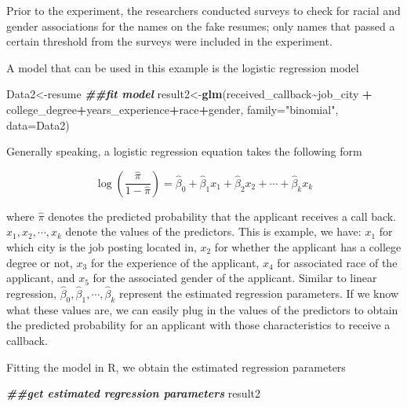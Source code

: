 \documentclass[
]{book}
\newenvironment{Shaded}{\begin{snugshade}}{\end{snugshade}}
\newcommand{\AttributeTok}[1]{\textcolor[rgb]{0.13,0.29,0.53}{#1}}
\newcommand{\DocumentationTok}[1]{\textcolor[rgb]{0.56,0.35,0.01}{\textbf{\textit{#1}}}}
\newcommand{\FunctionTok}[1]{\textcolor[rgb]{0.13,0.29,0.53}{\textbf{#1}}}
\newcommand{\NormalTok}[1]{#1}
\newcommand{\OtherTok}[1]{\textcolor[rgb]{0.56,0.35,0.01}{#1}}
\newcommand{\SpecialCharTok}[1]{\textcolor[rgb]{0.81,0.36,0.00}{\textbf{#1}}}
\newcommand{\StringTok}[1]{\textcolor[rgb]{0.31,0.60,0.02}{#1}}
\begin{document}
Prior to the experiment, the researchers conducted surveys to check for racial and gender associations for the names on the fake resumes; only names that passed a certain threshold from the surveys were included in the experiment.

A model that can be used in this example is the logistic regression model

\begin{Shaded}
\begin{Highlighting}[]
\NormalTok{Data2}\OtherTok{\textless{}{-}}\NormalTok{resume}
\DocumentationTok{\#\#fit model}
\NormalTok{result2}\OtherTok{\textless{}{-}}\FunctionTok{glm}\NormalTok{(received\_callback}\SpecialCharTok{\textasciitilde{}}\NormalTok{job\_city }\SpecialCharTok{+}\NormalTok{ college\_degree}\SpecialCharTok{+}\NormalTok{years\_experience}\SpecialCharTok{+}\NormalTok{race}\SpecialCharTok{+}\NormalTok{gender, }\AttributeTok{family=}\StringTok{"binomial"}\NormalTok{, }\AttributeTok{data=}\NormalTok{Data2)}
\end{Highlighting}
\end{Shaded}

Generally speaking, a logistic regression equation takes the following form

\[
\log (\frac{\hat{\pi}}{1-\hat{\pi}}) = \hat{\beta}_0 + \hat{\beta}_1 x_1 + \hat{\beta}_2 x_2 + \cdots + \hat{\beta}_k x_k
\]

where \(\hat{\pi}\) denotes the predicted probability that the applicant receives a call back. \(x_1, x_2, \cdots, x_k\) denote the values of the predictors. This is example, we have: \(x_1\) for which city is the job posting located in, \(x_2\) for whether the applicant has a college degree or not, \(x_3\) for the experience of the applicant, \(x_4\) for associated race of the applicant, and \(x_5\) for the associated gender of the applicant. Similar to linear regression, \(\hat{\beta}_0, \hat{\beta}_1, \cdots, \hat{\beta}_k\) represent the estimated regression parameters. If we know what these values are, we can easily plug in the values of the predictors to obtain the predicted probability for an applicant with those characteristics to receive a callback.

Fitting the model in R, we obtain the estimated regression parameters

\begin{Shaded}
\begin{Highlighting}[]
\DocumentationTok{\#\#get estimated regression parameters}
\NormalTok{result2}
\end{Highlighting}
\end{Shaded}
\end{document}
